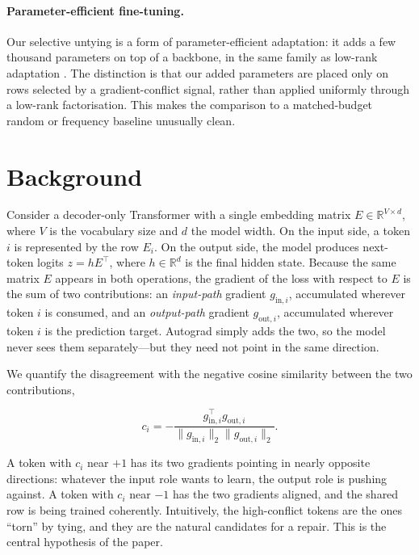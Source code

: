\documentclass[conference]{IEEEtran}
\begin{document}
\paragraph{Parameter-efficient fine-tuning.}
Our selective untying is a form of parameter-efficient adaptation: it adds a few
thousand parameters on top of a backbone, in the same family as low-rank
adaptation \cite{lora}. The distinction is that our added parameters are placed
only on rows selected by a gradient-conflict signal, rather than applied
uniformly through a low-rank factorisation. This makes the comparison to a
matched-budget random or frequency baseline unusually clean.

\section{Background}

Consider a decoder-only Transformer with a single embedding matrix
$E\in\mathbb{R}^{V\times d}$, where $V$ is the vocabulary size and $d$ the model
width. On the input side, a token $i$ is represented by the row $E_i$. On the
output side, the model produces next-token logits $z = h E^{\top}$, where
$h\in\mathbb{R}^{d}$ is the final hidden state. Because the same matrix $E$
appears in both operations, the gradient of the loss with respect to $E$ is the
sum of two contributions: an \emph{input-path} gradient $g_{\mathrm{in},i}$,
accumulated wherever token $i$ is consumed, and an \emph{output-path} gradient
$g_{\mathrm{out},i}$, accumulated wherever token $i$ is the prediction target.
Autograd simply adds the two, so the model never sees them separately---but they
need not point in the same direction.

We quantify the disagreement with the negative cosine similarity between the two
contributions,

\begin{equation}
c_i=-\frac{g_{\mathrm{in},i}^{\top}g_{\mathrm{out},i}}
{\lVert g_{\mathrm{in},i}\rVert_2\lVert g_{\mathrm{out},i}\rVert_2}.
\label{eq:conflict}
\end{equation}

A token with $c_i$ near $+1$ has its two gradients pointing in nearly opposite
directions: whatever the input role wants to learn, the output role is pushing
against. A token with $c_i$ near $-1$ has the two gradients aligned, and the
shared row is being trained coherently. Intuitively, the high-conflict tokens
are the ones ``torn'' by tying, and they are the natural candidates for a repair.
This is the central hypothesis of the paper.
\end{document}
